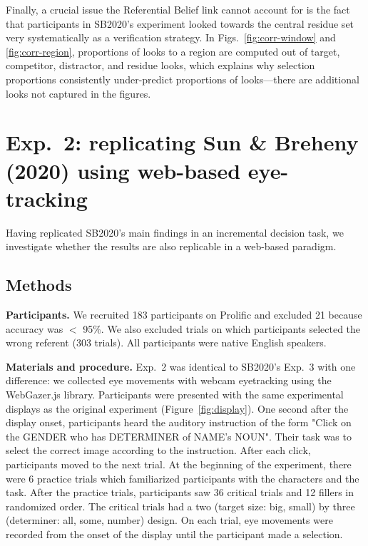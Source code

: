 \documentclass[10pt,letterpaper]{article}
\newcommand{\figref}[1]{Figure~\ref{#1}}
\newcommand{\expref}[1]{Exp.~#1}
\begin{document}
Finally, a crucial issue the Referential Belief link cannot account for is the fact that participants in SB2020's experiment looked towards the central residue set very systematically as a verification strategy. In Figs.~\ref{fig:corr-window} and \ref{fig:corr-region}, proportions of looks to a region are computed out of target, competitor, distractor, and residue looks, which explains why selection proportions consistently under-predict proportions of looks---there are additional looks not captured in the figures. 

\section{Exp.~2: replicating Sun \& Breheny (2020) using web-based eye-tracking}

Having replicated SB2020's main findings in an incremental decision task, we investigate whether the results are also replicable in a web-based paradigm.

\subsection{Methods}

\textbf{Participants.} We recruited 183 participants on Prolific and excluded 21  because  accuracy was $<$ 95\%. We also excluded trials on which participants selected the wrong referent (303 trials). All participants were native English speakers.


\textbf{Materials and procedure.} \expref{2} was identical to SB2020's \expref{3} with one difference: we collected eye movements with webcam eyetracking using the WebGazer.js \cite{papoutsaki2016webgazer} library. Participants were presented with the same experimental displays as the original experiment (\figref{fig:display}). One second after the display onset, participants heard the auditory instruction of the form "Click on the GENDER who has DETERMINER of NAME's NOUN". Their task was to select the correct image according to the instruction. After each click, participants moved to the next trial. At the beginning of the experiment, there were 6 practice trials which familiarized participants with the characters and the task. After the practice trials, participants saw 36 critical trials and 12 fillers in randomized order. The critical trials had a two (target size: big, small) by three (determiner: all, some, number) design. On each trial, eye movements were recorded from the onset of the display until the participant made a selection.
\end{document}
